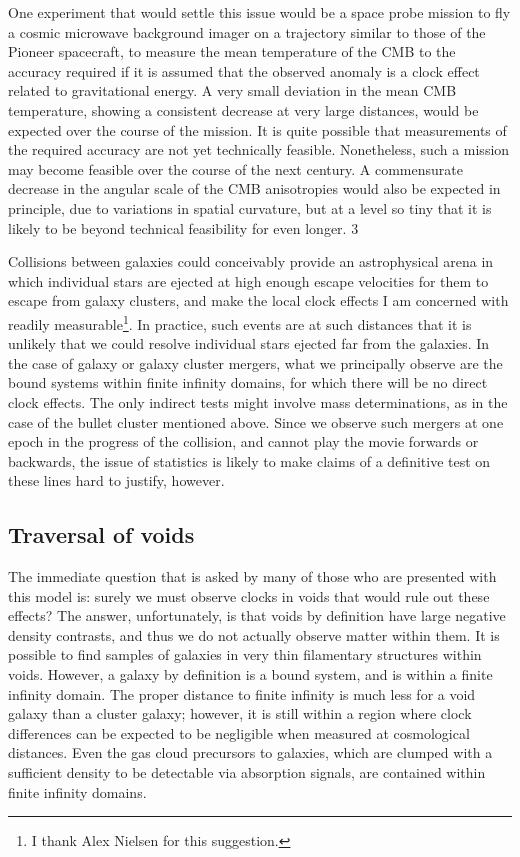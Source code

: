 \documentclass[12pt]{iopart}
\begin{document}
One experiment that would settle this issue would be a space probe mission
to fly a cosmic microwave background imager on a trajectory similar
to those of the Pioneer spacecraft, to measure the mean temperature of
the CMB to the accuracy required if it is assumed that the observed
anomaly is a clock effect related to gravitational energy. A very small
deviation in the mean CMB temperature, showing a consistent decrease at
very large distances, would be expected over the course
of the mission. It is quite possible that measurements of the required
accuracy are not yet technically feasible. Nonetheless, such a mission
may become feasible over the course of the next century. A commensurate
decrease in the angular scale of the CMB anisotropies would also be
expected in principle, due to variations in spatial curvature, but at a
level so tiny that it is likely to be beyond technical feasibility for
even longer.
\setcounter{footnote}3

Collisions between galaxies could conceivably provide an astrophysical arena
in which individual stars are ejected at high enough escape velocities for
them to escape from galaxy clusters, and make the local clock effects I am
concerned with readily measurable\footnote{I thank Alex Nielsen for this
suggestion.}. In practice, such events are at such distances that it is
unlikely that we could resolve individual stars ejected far from the
galaxies. In the case of galaxy or galaxy cluster mergers, what we principally
observe are the bound systems within finite infinity domains, for which there
will be no direct clock effects. The only indirect tests might involve mass
determinations, as in the case of the bullet cluster mentioned above.
Since we observe such mergers at one epoch in the progress of the collision,
and cannot play the movie forwards or backwards, the issue of statistics
\cite{Hayashi} is likely to make claims of a definitive test on these
lines hard to justify, however.

\subsection{Traversal of voids}

The immediate question that is asked by many of those who are presented with
this model is: surely we must observe clocks in voids that would rule
out these effects? The answer, unfortunately, is that voids by definition
have large negative density contrasts, and thus we do not actually observe
matter within them. It is possible to find samples of galaxies in very
thin filamentary structures within voids. However, a galaxy by definition
is a bound system, and is within a finite infinity domain. The proper
distance to finite infinity is much less for a void galaxy than a cluster
galaxy; however, it is still within a region where clock differences can be
expected to be negligible when measured at cosmological distances.
Even the gas cloud precursors to galaxies, which are clumped with
a sufficient density to be detectable via absorption signals, are contained
within finite infinity domains.
\end{document}
